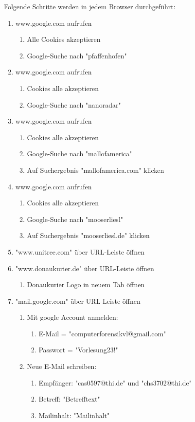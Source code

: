 Folgende Schritte werden in jedem Browser durchgeführt: 

\begin{enumerate}
\item  www.google.com aufrufen
	\begin{enumerate}[label*=\arabic*.]
	\item Alle Cookies akzeptieren 
	\item Google-Suche nach "pfaffenhofen"
	\end{enumerate}
\item www.google.com aufrufen
	\begin{enumerate}[label*=\arabic*.]
	\item Cookies alle akzeptieren 
	\item Google-Suche nach "nanoradar" 
	\end{enumerate}
\item www.google.com aufrufen
	\begin{enumerate}[label*=\arabic*.]
	\item Cookies alle akzeptieren 
	\item Google-Suche nach "mallofamerica"
	\item Auf Suchergebnis "mallofamerica.com" klicken
	\end{enumerate}
\item www.google.com aufrufen
	\begin{enumerate}[label*=\arabic*.]
	\item Cookies alle akzeptieren 
	\item Google-Suche nach "mooserliesl"
	\item Auf Suchergebnis "mooserliesl.de" klicken
	\end{enumerate}
\item "www.unitree.com" über URL-Leiste öffnen
\item "www.donaukurier.de" über URL-Leiste öffnen
	\begin{enumerate}[label*=\arabic*.]
	\item Donaukurier Logo in neuem Tab öffnen
	\end{enumerate}
\item "mail.google.com" über URL-Leiste öffnen
	\begin{enumerate}[label*=\arabic*.]
	\item Mit google Account anmelden: 
			\begin{enumerate}[label*=\arabic*.]
			\item E-Mail = "computerforensikvl@gmail.com"
			\item Passwort = "Vorlesung23!"
			\end{enumerate}
	\item Neue E-Mail schreiben:
			\begin{enumerate}[label*=\arabic*.]
			\item Empfänger: "cas0597@thi.de" und "chs3702@thi.de"
			\item Betreff: "Betrefftext"
			\item Mailinhalt: "Mailinhalt"
			\end{enumerate}			
	\end{enumerate}
\end{enumerate}

